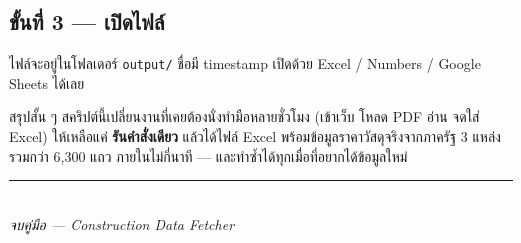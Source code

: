 \documentclass[12pt,a4paper]{article}
\begin{document}
\subsection*{ขั้นที่ 3 — เปิดไฟล์}
ไฟล์จะอยู่ในโฟลเดอร์ \texttt{output/} ชื่อมี timestamp
เปิดด้วย Excel / Numbers / Google Sheets ได้เลย

\vspace{1em}
\begin{infobox}{สรุปสั้น ๆ}
สคริปต์นี้เปลี่ยนงานที่เคยต้องนั่งทำมือหลายชั่วโมง
(เข้าเว็บ โหลด PDF อ่าน จดใส่ Excel) ให้เหลือแค่ \textbf{รันคำสั่งเดียว}
แล้วได้ไฟล์ Excel พร้อมข้อมูลราคาวัสดุจริงจากภาครัฐ 3 แหล่ง
รวมกว่า 6,300 แถว ภายในไม่กี่นาที — และทำซ้ำได้ทุกเมื่อที่อยากได้ข้อมูลใหม่
\end{infobox}

\vfill
\begin{center}
\color{linecol}\rule{0.5\textwidth}{0.4pt}\\[0.5em]
\textit{จบคู่มือ — Construction Data Fetcher}
\end{center}
\end{document}
